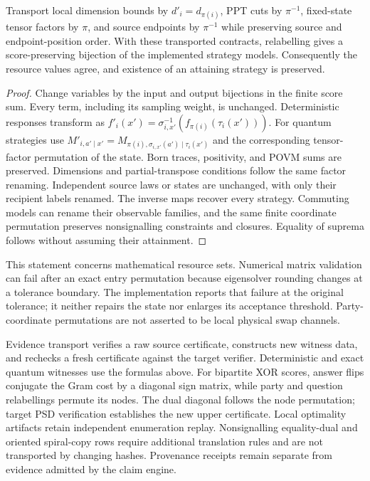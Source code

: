 \begin{proposition}
Transport local dimension bounds by $d'_i=d_{\pi(i)}$, PPT cuts by
$\pi^{-1}$, fixed-state tensor factors by $\pi$, and source endpoints by
$\pi^{-1}$ while preserving source and endpoint-position order. With these
transported contracts, relabelling gives a score-preserving bijection of the
implemented strategy models. Consequently the resource values agree, and
existence of an attaining strategy is preserved.
\end{proposition}
\begin{proof}
Change variables by the input and output bijections in the finite score sum.
Every term, including its sampling weight, is unchanged. Deterministic responses
transform as $f'_i(x')=\sigma_{i,x'}^{-1}(f_{\pi(i)}(\tau_i(x')))$.
For quantum strategies use
$M'_{i,a'\mid x'}=M_{\pi(i),\sigma_{i,x'}(a')\mid\tau_i(x')}$
and the corresponding tensor-factor permutation of the state. Born traces,
positivity, and POVM sums are preserved. Dimensions and partial-transpose
conditions follow the same factor renaming. Independent source laws or states
are unchanged, with only their recipient labels renamed. The inverse maps
recover every strategy. Commuting models can rename their observable families,
and the same finite coordinate permutation preserves nonsignalling constraints
and closures. Equality of suprema follows without assuming their attainment.
\end{proof}

This statement concerns mathematical resource sets. Numerical matrix validation
can fail after an exact entry permutation because eigensolver rounding changes
at a tolerance boundary. The implementation reports that failure at the original
tolerance; it neither repairs the state nor enlarges its acceptance threshold.
Party-coordinate permutations are not asserted to be local physical swap channels.

Evidence transport verifies a raw source certificate, constructs new witness
data, and rechecks a fresh certificate against the target verifier. Deterministic
and exact quantum witnesses use the formulas above. For bipartite XOR scores,
answer flips conjugate the Gram cost by a diagonal sign matrix, while party and
question relabellings permute its nodes. The dual diagonal follows the node
permutation; target PSD verification establishes the new upper certificate.
Local optimality artifacts retain independent enumeration replay. Nonsignalling
equality-dual and oriented spiral-copy rows require additional translation rules
and are not transported by changing hashes. Provenance receipts remain separate
from evidence admitted by the claim engine.
